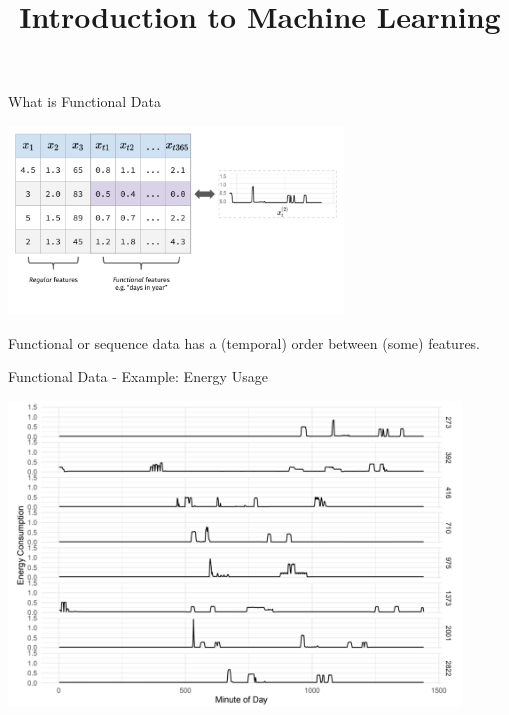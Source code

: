 



\newcommand{\titlefigure}{figure_man/automl2.png}
\newcommand{\learninggoals}{
  \item ...
  \item ...
}

\title{Introduction to Machine Learning}
\date{}




\begin{vbframe}{What is Functional Data}
    \begin{center}
        \includegraphics[height = 5cm]{figure_man/definition.png}
    \end{center}
    
    Functional or sequence data has a (temporal) order between (some) features.
\end{vbframe}

\begin{vbframe}{Functional Data - Example: Energy Usage}
    
    \begin{center}
        \includegraphics[width=0.9\textwidth]{figure_man/energy-usage.png}
    \end{center}
    
    
\end{vbframe}


